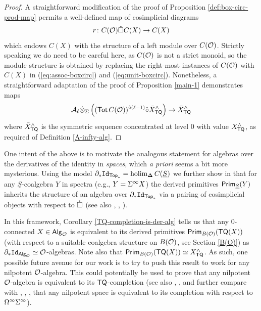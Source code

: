\begin{proof}
    A straightforward modification of the proof of Proposition \ref{def:box-circ-prod-map} permits a well-defined map of cosimplicial diagrams \[r\colon  C(\mathcal{O}) \mathring{\square} C(X)\to C(X)\] which endows $C(X)$ with the structure of a left module over $ C(\mathcal{O})$. Strictly speaking we do need to be careful here, as $ C(\mathcal{O})$ is not a strict monoid, so the module structure is obtained by replacing the right-most instances of $ C(\mathcal{O})$ with $C(X)$ in (\ref{eq:assoc-boxcirc}) and (\ref{eq:unit-boxcirc}). Nonetheless, a straightforward adaptation of the proof of Proposition \ref{main-1} demonstrates maps \[\mathcal{A}_{\ell} \dot{\otimes}_{\Sigma}  \left( (\operatorname{\mathsf{Tot}} C(\mathcal{O}))^{\hat{\circ} (\ell-1)} \hat{\circ} \bar{X}_{\mathsf{TQ}}^{\wedge}\right)\to \bar{X}_{\mathsf{TQ}}^{\wedge}\] where $\bar{X}_{\mathsf{TQ}}^{\wedge}$ is the symmetric sequence concentrated at level $0$ with value $X_{\mathsf{TQ}}^{\wedge}$, as required of Definition \ref{A-infty-alg}.
\end{proof}

\begin{remark}
    One intent of the above is to motivate the analogous statement for algebras over the derivatives of the identity in \textit{spaces}, which \textit{a priori} seems a bit more mysterious. Using the model $\partial_* \mathtt{Id}_{\mathsf{Top}_*} =\operatorname{holim}_{\mathbf{\Delta}} C(\underline{S})$  we further show in \cite{Clark-2} that for any $\underline{S}$-coalgebra $Y$ in spectra (e.g., $Y=\Sigma^{\infty} X$) the derived primitives $\operatorname{\mathsf{Prim}}_{\underline{S}}(Y)$ inherits the structure of an algebra over $\partial_* \mathtt{Id}_{\mathsf{Top}_*}$ via a pairing of cosimplicial objects with respect to $\mathring{\square}$ (see also \cite{Ching-thesis}, \cite{Heuts-vn}, \cite{BR}).
    
    In this framework, Corollary \ref{TQ-completion-is-der-alg} tells us that any $0$-connected $X\in {\mathsf{Alg}_{\mathcal{O}}}$ is equivalent to its derived primitives $\operatorname{\mathsf{Prim}}_{B(\mathcal{O})}( \mathsf{TQ}(X) )$ (with respect to a suitable coalgebra structure on $B(\mathcal{O})$, see Section \ref{B(O)}) as $\partial_* \mathtt{Id}_{{\mathsf{Alg}_{\mathcal{O}}}}\simeq \mathcal{O}$-algebras. Note also that $\mathsf{Prim}_{B(\mathcal{O})}(\mathsf{TQ}(X))\simeq X^{\wedge}_{\mathsf{TQ}}$. As such, one possible future avenue for our work is to try to push this result to work for any nilpotent $\mathcal{O}$-algebra. This could potentially be used to prove that any nilpotent $\mathcal{O}$-algebra is equivalent to its $\mathsf{TQ}$-completion (see also \cite{Blom}, \cite{Niko}, and further compare with \cite{BK}, \cite{AK}, \cite{Carl}, \cite{BH-2} that any nilpotent space is equivalent to its completion with respect to $\Omega^{\infty} \Sigma^{\infty}$).
    \end{remark}
    
